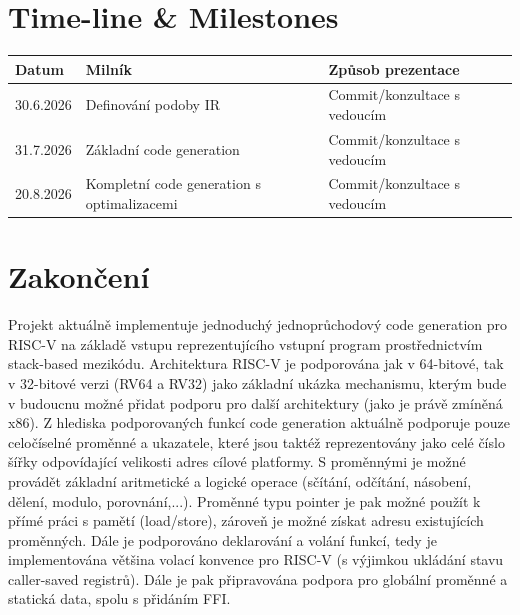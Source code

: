 \documentclass{article}
\def\xxx#1{\textcolor{red!50}{\itshape #1}}
\begin{document}
\section{Time-line \& Milestones}


\begin{center}
\begin{tabular}{lll}
\toprule
Datum & Milník & Způsob prezentace \\
\midrule
30.6.2026 & Definování podoby IR & Commit/konzultace s vedoucím \\
31.7.2026 & Základní code generation & Commit/konzultace s vedoucím \\
20.8.2026 & Kompletní code generation s optimalizacemi & Commit/konzultace s vedoucím \\
\bottomrule
\end{tabular}
\end{center}

\clearpage
\section{Zakončení}

Projekt aktuálně implementuje jednoduchý jednoprůchodový code generation pro RISC-V na základě vstupu reprezentujícího vstupní program prostřednictvím stack-based mezikódu. Architektura RISC-V je podporována jak v 64-bitové, tak v 32-bitové verzi (RV64 a RV32) jako základní ukázka mechanismu, kterým bude v budoucnu možné přidat podporu pro další architektury (jako je právě zmíněná x86). Z hlediska podporovaných funkcí code generation aktuálně podporuje pouze celočíselné proměnné a ukazatele, které jsou taktéž reprezentovány jako celé číslo šířky odpovídající velikosti adres cílové platformy. S proměnnými je možné provádět základní aritmetické a logické operace (sčítání, odčítání, násobení, dělení, modulo, porovnání,...). Proměnné typu pointer je pak možné použít k přímé práci s pamětí (load/store), zároveň je možné získat adresu existujících proměnných. Dále je podporováno deklarování a volání funkcí, tedy je implementována většina volací konvence pro RISC-V (s výjimkou ukládání stavu caller-saved registrů). Dále je pak připravována podpora pro globální proměnné a statická data, spolu s přidáním FFI.
\end{document}

